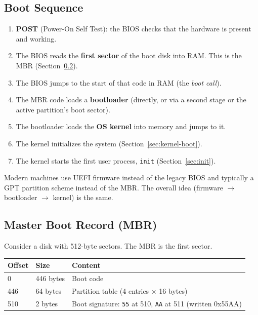 \documentclass{article}
\begin{document}
\subsection{Boot Sequence}
\begin{enumerate}
	\item \textbf{POST} (Power-On Self Test): the BIOS checks that the hardware is present and working.
	\item The BIOS reads the \textbf{first sector} of the boot disk into RAM. This is the MBR (Section~\ref{sec:mbr}).
	\item The BIOS jumps to the start of that code in RAM (the \emph{boot call}).
	\item The MBR code loads a \textbf{bootloader} (directly, or via a second stage or the active partition's boot sector).
	\item The bootloader loads the \textbf{OS kernel} into memory and jumps to it.
	\item The kernel initializes the system (Section~\ref{sec:kernel-boot}).
	\item The kernel starts the first user process, \texttt{init} (Section~\ref{sec:init}).
\end{enumerate}

\begin{extra}[UEFI]
	Modern machines use UEFI firmware instead of the legacy BIOS and typically a GPT partition scheme instead of the MBR. The overall idea (firmware $\rightarrow$ bootloader $\rightarrow$ kernel) is the same.
\end{extra}

\subsection{Master Boot Record (MBR)}
\label{sec:mbr}
Consider a disk with 512-byte sectors. The MBR is the first sector.

\begin{table}[H]
	\centering
	\begin{tabular}{lll}
		\toprule
		\textbf{Offset} & \textbf{Size} & \textbf{Content} \\
		\midrule
		0 & 446 bytes & Boot code \\
		446 & 64 bytes & Partition table (4 entries $\times$ 16 bytes) \\
		510 & 2 bytes & Boot signature: \texttt{55} at 510, \texttt{AA} at 511 (written 0x55AA) \\
		\bottomrule
	\end{tabular}
\end{table}
\end{document}
